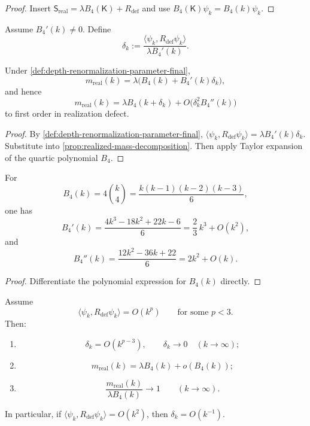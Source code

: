 \begin{proof}
Insert
\(\mathsf S_{\mathrm{real}}=\lambda B_4(\mathsf K)+R_{\mathrm{def}}\)
and use
\(B_4(\mathsf K)\psi_k=B_4(k)\psi_k\).
\end{proof}

\begin{definition}
\label{def:depth-renormalization-parameter-final}
Assume \(B_4'(k)\neq 0\).
Define
\[
  \delta_k
  :=
  \frac{\langle \psi_k,R_{\mathrm{def}}\psi_k\rangle}{\lambda B_4'(k)}.
\]
\end{definition}

\begin{proposition}
\label{prop:first-order-corrected-spectrum}
Under
\cref{def:depth-renormalization-parameter-final},
\[
  m_{\mathrm{real}}(k)
  =
  \lambda\bigl(B_4(k)+B_4'(k)\delta_k\bigr),
\]
and hence
\[
  m_{\mathrm{real}}(k)
  =
  \lambda B_4(k+\delta_k)
  +
  O\!\bigl(\delta_k^2B_4''(k)\bigr)
\]
to first order in realization defect.
\end{proposition}

\begin{proof}
By
\cref{def:depth-renormalization-parameter-final},
\(
\langle \psi_k,R_{\mathrm{def}}\psi_k\rangle=\lambda B_4'(k)\delta_k
\).
Substitute into
\cref{prop:realized-mass-decomposition}.
Then apply Taylor expansion of the quartic polynomial \(B_4\).
\end{proof}

\begin{lemma}
\label{lem:quartic-derivative-asymptotics-final}
For
\[
  B_4(k)
  =
  4\binom{k}{4}
  =
  \frac{k(k-1)(k-2)(k-3)}{6},
\]
one has
\[
  B_4'(k)
  =
  \frac{4k^3-18k^2+22k-6}{6}
  =
  \frac23\,k^3+O(k^2),
\]
and
\[
  B_4''(k)
  =
  \frac{12k^2-36k+22}{6}
  =
  2k^2+O(k).
\]
\end{lemma}

\begin{proof}
Differentiate the polynomial expression for \(B_4(k)\) directly.
\end{proof}

\begin{theorem}
\label{thm:asymptotic-exactness-quartic-mass-law-final}
Assume
\[
  \langle \psi_k,R_{\mathrm{def}}\psi_k\rangle = O(k^p)
  \qquad
  \text{for some }p<3.
\]
Then:
\begin{enumerate}[label=\textup{(\roman*)}]
\item
      \[
        \delta_k = O(k^{p-3}),
        \qquad
        \delta_k\to 0
        \quad (k\to\infty);
      \]
\item
      \[
        m_{\mathrm{real}}(k)=\lambda B_4(k)+o(B_4(k));
      \]
\item
      \[
        \frac{m_{\mathrm{real}}(k)}{\lambda B_4(k)}\to 1
        \qquad
        (k\to\infty).
      \]
\end{enumerate}
In particular, if
\(
\langle \psi_k,R_{\mathrm{def}}\psi_k\rangle = O(k^2)
\), then
\(
\delta_k = O(k^{-1})
\).
\end{theorem}

